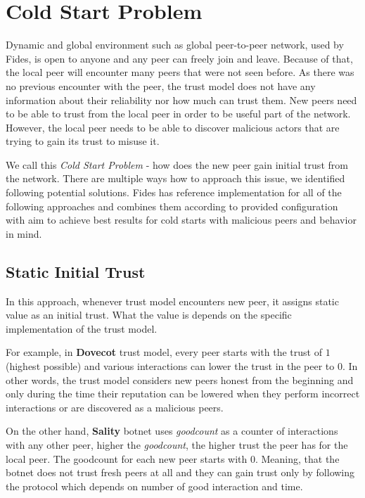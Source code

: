 \section{Cold Start Problem}
\label{sec:cold-start-problem}
Dynamic and global environment such as global peer-to-peer network, used by Fides, is open to anyone and any peer can freely join and leave. Because of that, the local peer will encounter many peers that were not seen before. As there was no previous encounter with the peer, the trust model does not have any information about their reliability nor how much can trust them. 
New peers need to be able to trust from the local peer in order to be useful part of the network. However, the local peer needs to be able to discover malicious actors that are trying to gain its trust to misuse it. 

We call this \textit{Cold Start Problem} - how does the new peer gain initial trust from the network. There are multiple ways how to approach this issue, we identified following potential solutions. 
Fides has reference implementation for all of the following approaches and combines them according to provided configuration with aim to achieve best results for cold starts with malicious peers and behavior in mind.

\subsection{Static Initial Trust}
\label{subsec:static-initial-trust}
In this approach, whenever trust model encounters new peer, it assigns static value as an initial trust. What the value is depends on the specific implementation of the trust model.

For example, in \textbf{Dovecot} trust model, every peer starts with the trust of $1$ (highest possible) and various interactions can lower the trust in the peer to $0$. In other words, the trust model considers new peers honest from the beginning and only during the time their reputation can be lowered when they perform incorrect interactions or are discovered as a malicious peers.

On the other hand, \textbf{Sality} botnet uses \textit{goodcount} as a counter of interactions with any other peer, higher the \textit{goodcount}, the higher trust the peer has for the local peer. The goodcount for each new peer starts with $0$. Meaning, that the botnet does not trust fresh peers at all and they can gain trust only by following the protocol which depends on number of good interaction and time.

